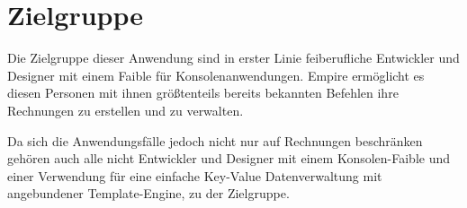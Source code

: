 
\section{Zielgruppe}

Die Zielgruppe dieser Anwendung sind in erster Linie feiberufliche Entwickler und Designer mit einem Faible für Konsolenanwendungen. Empire ermöglicht es diesen Personen mit ihnen größtenteils bereits bekannten Befehlen ihre Rechnungen zu erstellen und zu verwalten.

\parskip 12pt

Da sich die Anwendungsfälle jedoch nicht nur auf Rechnungen beschränken gehören auch alle nicht Entwickler und Designer mit einem Konsolen-Faible und einer Verwendung für eine einfache Key-Value Datenverwaltung mit angebundener Template-Engine, zu der Zielgruppe.
